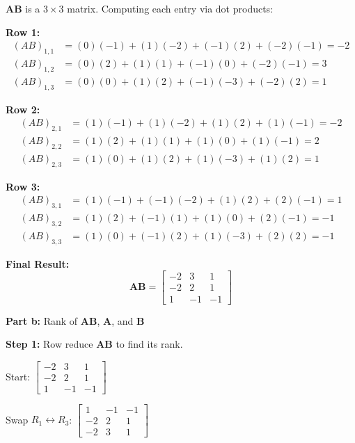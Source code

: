 \documentclass{article}
\begin{document}
\begin{aprob}
    $\mathbf{AB}$ is a $3 \times 3$ matrix. Computing each entry via dot products:

    \textbf{Row 1:}
    \begin{align*}
        (AB)_{1,1} &= (0)(-1) + (1)(-2) + (-1)(2) + (-2)(-1) = -2 \\
        (AB)_{1,2} &= (0)(2) + (1)(1) + (-1)(0) + (-2)(-1) = 3 \\
        (AB)_{1,3} &= (0)(0) + (1)(2) + (-1)(-3) + (-2)(2) = 1
    \end{align*}

    \textbf{Row 2:}
    \begin{align*}
        (AB)_{2,1} &= (1)(-1) + (1)(-2) + (1)(2) + (1)(-1) = -2 \\
        (AB)_{2,2} &= (1)(2) + (1)(1) + (1)(0) + (1)(-1) = 2 \\
        (AB)_{2,3} &= (1)(0) + (1)(2) + (1)(-3) + (1)(2) = 1
    \end{align*}

    \textbf{Row 3:}
    \begin{align*}
        (AB)_{3,1} &= (1)(-1) + (-1)(-2) + (1)(2) + (2)(-1) = 1 \\
        (AB)_{3,2} &= (1)(2) + (-1)(1) + (1)(0) + (2)(-1) = -1 \\
        (AB)_{3,3} &= (1)(0) + (-1)(2) + (1)(-3) + (2)(2) = -1
    \end{align*}

    \textbf{Final Result:}
    \[
        \boxed{\mathbf{AB} = \begin{bmatrix} -2 & 3 & 1 \\ -2 & 2 & 1 \\ 1 & -1 & -1 \end{bmatrix}}
    \]

    \bigskip
    \begin{mdframed}
    \textbf{\large Part b:} Rank of $\mathbf{AB}$, $\mathbf{A}$, and $\mathbf{B}$
    \end{mdframed}

    \textbf{Step 1:} Row reduce $\mathbf{AB}$ to find its rank.

    Start:
    $\begin{bmatrix} -2 & 3 & 1 \\ -2 & 2 & 1 \\ 1 & -1 & -1 \end{bmatrix}$

    Swap $R_1 \leftrightarrow R_3$:
    $\begin{bmatrix} 1 & -1 & -1 \\ -2 & 2 & 1 \\ -2 & 3 & 1 \end{bmatrix}$


\end{aprob}
\end{document}
